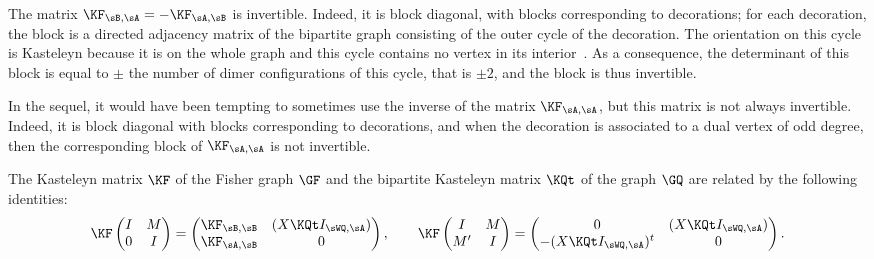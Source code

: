 \documentclass[a4paper,twoside,11pt]{article}
\begin{document}
\begin{rem}\label{rem:KABinv}
The matrix $\KF_{\sB,\sA}=-\KF_{\sA,\sB}$ is invertible. Indeed, it is block diagonal, with blocks corresponding 
to decorations; for each decoration, the block is a directed adjacency matrix of the bipartite graph consisting of the outer cycle of 
the decoration. The orientation on this cycle is Kasteleyn because it is on the whole graph and this cycle contains no vertex 
in its interior~\cite{Kasteleyn2}. As a consequence, the determinant of this block is equal to $\pm$ the number of dimer configurations
of this cycle, that is $\pm 2$, and the block is thus invertible.

In the sequel, it would have been tempting to sometimes use the inverse of the matrix 
$\KF_{\sA,\sA}$, but this matrix is not always invertible. Indeed, it is block diagonal with blocks corresponding to decorations, and 
when the decoration is associated to a dual vertex of odd degree, then the corresponding block of $\KF_{\sA,\sA}$ is not invertible.
\end{rem}


\begin{prop}\emph{\cite{Dubedat}}\label{prop:Dub}
The Kasteleyn matrix $\KF$ of the Fisher graph $\GF$ and the bipartite Kasteleyn matrix $\KQt$ of the graph $\GQ$ are related by 
the following identities:
\begin{equation*}
\KF
\begin{pmatrix}
I&M\\
0&I
\end{pmatrix}
=
\begin{pmatrix}
\KF_{\sB,\sB}& (X \KQt I_{\sWQ,\sA})\\
\KF_{\sA,\sB}&0
\end{pmatrix},\quad \quad 
\KF
\begin{pmatrix}
I&M\\
M'&I
\end{pmatrix}
=
\begin{pmatrix}
0& (X \KQt I_{\sWQ,\sA})\\
-(X \KQt I_{\sWQ,\sA})^t&0
\end{pmatrix}. 
\end{equation*}

\end{prop}
\end{document}
